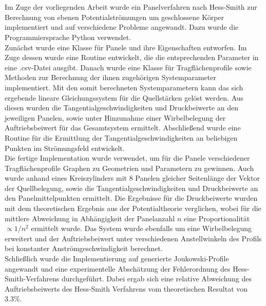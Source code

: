 \chapter*{\abstractname} %
Im Zuge der vorliegenden Arbeit wurde ein Panelverfahren nach Hess-Smith zur Berechnung von ebenen Potentialströmungen um geschlossene Körper implementiert und auf verschiedene Probleme angewandt. Dazu wurde die Programmiersprache Python verwendet.
\\
Zunächst wurde eine Klasse für Panele und ihre Eigenschaften entworfen. Im Zuge dessen wurde eine Routine entwickelt, die die entsprechenden Parameter in eine .csv-Datei ausgibt. Danach wurde eine Klasse für Tragflächenprofile sowie Methoden zur Berechnung der ihnen zugehörigen Systemparameter implementiert. Mit den somit berechneten Systemparametern kann das sich ergebende lineare Gleichungssystem für die Quellstärken gelöst werden. Aus diesen wurden die Tangentialgeschwindigkeiten und Druckbeiwerte an den jeweiligen Panelen, sowie unter Hinzunahme einer Wirbelbelegung der Auftriebsbeiwert für das Gesamtsystem ermittelt. Abschließend wurde eine Routine für die Ermittlung der Tangentialgeschwindigkeiten an beliebigen Punkten im Strömungsfeld entwickelt.
\\
Die fertige Implementation wurde verwendet, um für die Panele verschiedener Tragflächenprofile Graphen zu Geometrien und Parametern zu gewinnen. Auch wurde anhand eines Kreiszylinders mit 8 Panelen gleicher Seitenlänge der Vektor der Quellbelegung, sowie die Tangentialgeschwindigkeiten und Druckbeiwerte an den Panelmittelpunkten ermittelt. Die Ergebnisse für die Druckbeiwerte wurden mit dem theoretischen Ergebnis aus der Potentialtheorie verglichen, wobei für die mittlere Abweichung in Abhängigkeit der Panelanzahl $n$ eine Proportionalität $\propto 1 / n^2$ ermittelt wurde. Das System wurde ebenfalls um eine Wirbelbelegung erweitert und der Auftriebsbeiwert unter verschiedenen Anstellwinkeln des Profils bei konstanter Anströmgeschwindigkeit berechnet. 
\\
Schließlich wurde die Implementierung auf generierte Joukowski-Profile angewandt und eine experimentelle Abschätzung der Fehlerordnung des Hess-Smith-Verfahrens durchgeführt. Dabei ergab sich eine relative Abweichung des Auftriebsbeiwerts des Hess-Smith Verfahrens vom theoretischen Resultat von $3.3 \%$.

\newpage
